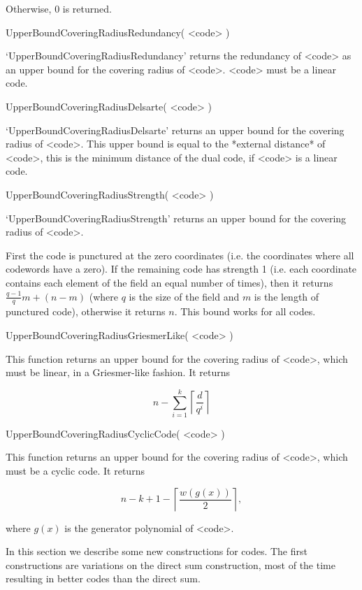 Otherwise, $0$ is returned.

\>UpperBoundCoveringRadiusRedundancy( <code> )

`UpperBoundCoveringRadiusRedundancy' returns the redundancy of <code>  as
an upper bound for the covering radius of <code>. <code> must be a linear
code.

\>UpperBoundCoveringRadiusDelsarte( <code> )

`UpperBoundCoveringRadiusDelsarte'  returns  an  upper  bound   for   the
covering radius of <code>. This upper bound  is  equal  to  the  *external
distance* of <code>, this is the minimum distance of the  dual  code,  if
<code> is a linear code.

\>UpperBoundCoveringRadiusStrength( <code> )

`UpperBoundCoveringRadiusStrength'  returns  an  upper  bound   for   the
covering radius of <code>.

First the code is punctured at the zero coordinates (i.e. the coordinates
where all codewords have a zero). If the remaining code  has  strength  1
(i.e. each coordinate contains each element of the field an equal  number
of times), then it returns $\frac{q-1}{q}m + (n-m)$  (where  $q$  is  the
size of the field and $m$ is the length of punctured code), otherwise  it
returns $n$. This bound works for all codes.

\>UpperBoundCoveringRadiusGriesmerLike( <code> )

This function returns an upper bound for the covering radius  of  <code>,
which must be linear, in a Griesmer-like fashion. It returns

$$
n - \sum_{i=1}^k \left\lceil \frac{d}{q^i} \right\rceil
$$

\>UpperBoundCoveringRadiusCyclicCode( <code> )

This function returns an upper bound for the covering radius  of  <code>,
which must be a cyclic code. It returns

$$
n - k + 1 - \left\lceil \frac{w(g(x))}{2} \right\rceil,
$$

where $g(x)$ is the generator polynomial of <code>.


In this section we describe some new constructions for codes.  The  first
constructions are variations on the direct sum construction, most of  the
time resulting in better codes than the direct sum.

